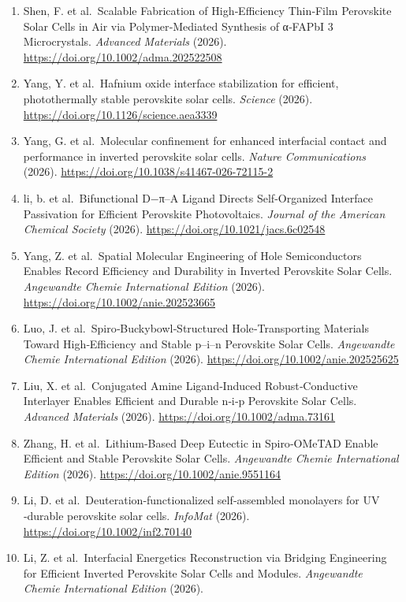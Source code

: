 \documentclass[
  11pt,
]{article}
\begin{document}
\begin{enumerate}
\item
  Shen, F. et al.~Scalable Fabrication of High‐Efficiency Thin‐Film
  Perovskite Solar Cells in Air via Polymer‐Mediated Synthesis of
  α‐FAPbI 3 Microcrystals. \emph{Advanced Materials} (2026).
  \url{https://doi.org/10.1002/adma.202522508}
\item
  Yang, Y. et al.~Hafnium oxide interface stabilization for efficient,
  photothermally stable perovskite solar cells. \emph{Science} (2026).
  \url{https://doi.org/10.1126/science.aea3339}
\item
  Yang, G. et al.~Molecular confinement for enhanced interfacial contact
  and performance in inverted perovskite solar cells. \emph{Nature
  Communications} (2026).
  \url{https://doi.org/10.1038/s41467-026-72115-2}
\item
  li, b. et al.~Bifunctional D−π--A Ligand Directs Self-Organized
  Interface Passivation for Efficient Perovskite Photovoltaics.
  \emph{Journal of the American Chemical Society} (2026).
  \url{https://doi.org/10.1021/jacs.6c02548}
\item
  Yang, Z. et al.~Spatial Molecular Engineering of Hole Semiconductors
  Enables Record Efficiency and Durability in Inverted Perovskite Solar
  Cells. \emph{Angewandte Chemie International Edition} (2026).
  \url{https://doi.org/10.1002/anie.202523665}
\item
  Luo, J. et al.~Spiro‐Buckybowl‐Structured Hole‐Transporting Materials
  Toward High‐Efficiency and Stable p--i--n Perovskite Solar Cells.
  \emph{Angewandte Chemie International Edition} (2026).
  \url{https://doi.org/10.1002/anie.202525625}
\item
  Liu, X. et al.~Conjugated Amine Ligand‐Induced Robust‐Conductive
  Interlayer Enables Efficient and Durable n‐i‐p Perovskite Solar Cells.
  \emph{Advanced Materials} (2026).
  \url{https://doi.org/10.1002/adma.73161}
\item
  Zhang, H. et al.~Lithium‐Based Deep Eutectic in Spiro‐OMeTAD Enable
  Efficient and Stable Perovskite Solar Cells. \emph{Angewandte Chemie
  International Edition} (2026).
  \url{https://doi.org/10.1002/anie.9551164}
\item
  Li, D. et al.~Deuteration‐functionalized self‐assembled monolayers for
  UV ‐durable perovskite solar cells. \emph{InfoMat} (2026).
  \url{https://doi.org/10.1002/inf2.70140}
\item
  Li, Z. et al.~Interfacial Energetics Reconstruction via Bridging
  Engineering for Efficient Inverted Perovskite Solar Cells and Modules.
  \emph{Angewandte Chemie International Edition} (2026).

\end{enumerate}
\end{document}
